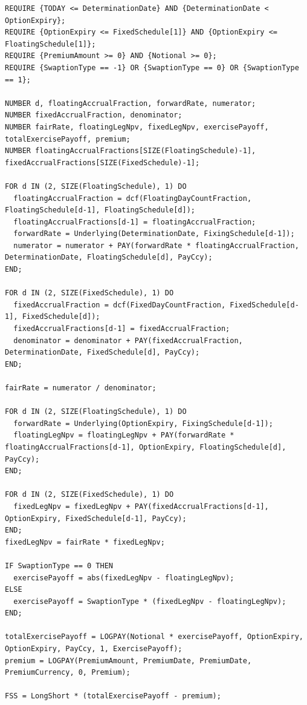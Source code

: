 \begin{listing}[hbt]
\begin{verbatim}
REQUIRE {TODAY <= DeterminationDate} AND {DeterminationDate < OptionExpiry};
REQUIRE {OptionExpiry <= FixedSchedule[1]} AND {OptionExpiry <= FloatingSchedule[1]};
REQUIRE {PremiumAmount >= 0} AND {Notional >= 0};
REQUIRE {SwaptionType == -1} OR {SwaptionType == 0} OR {SwaptionType == 1};

NUMBER d, floatingAccrualFraction, forwardRate, numerator;
NUMBER fixedAccrualFraction, denominator;
NUMBER fairRate, floatingLegNpv, fixedLegNpv, exercisePayoff, totalExercisePayoff, premium;
NUMBER floatingAccrualFractions[SIZE(FloatingSchedule)-1], fixedAccrualFractions[SIZE(FixedSchedule)-1];

FOR d IN (2, SIZE(FloatingSchedule), 1) DO
  floatingAccrualFraction = dcf(FloatingDayCountFraction, FloatingSchedule[d-1], FloatingSchedule[d]);
  floatingAccrualFractions[d-1] = floatingAccrualFraction;
  forwardRate = Underlying(DeterminationDate, FixingSchedule[d-1]);
  numerator = numerator + PAY(forwardRate * floatingAccrualFraction, DeterminationDate, FloatingSchedule[d], PayCcy);
END;

FOR d IN (2, SIZE(FixedSchedule), 1) DO
  fixedAccrualFraction = dcf(FixedDayCountFraction, FixedSchedule[d-1], FixedSchedule[d]);
  fixedAccrualFractions[d-1] = fixedAccrualFraction;
  denominator = denominator + PAY(fixedAccrualFraction, DeterminationDate, FixedSchedule[d], PayCcy);
END;

fairRate = numerator / denominator;

FOR d IN (2, SIZE(FloatingSchedule), 1) DO
  forwardRate = Underlying(OptionExpiry, FixingSchedule[d-1]);
  floatingLegNpv = floatingLegNpv + PAY(forwardRate * floatingAccrualFractions[d-1], OptionExpiry, FloatingSchedule[d], PayCcy);
END;

FOR d IN (2, SIZE(FixedSchedule), 1) DO
  fixedLegNpv = fixedLegNpv + PAY(fixedAccrualFractions[d-1], OptionExpiry, FixedSchedule[d-1], PayCcy);
END;
fixedLegNpv = fairRate * fixedLegNpv;

IF SwaptionType == 0 THEN
  exercisePayoff = abs(fixedLegNpv - floatingLegNpv);
ELSE
  exercisePayoff = SwaptionType * (fixedLegNpv - floatingLegNpv);
END;

totalExercisePayoff = LOGPAY(Notional * exercisePayoff, OptionExpiry, OptionExpiry, PayCcy, 1, ExercisePayoff);
premium = LOGPAY(PremiumAmount, PremiumDate, PremiumDate, PremiumCurrency, 0, Premium);

FSS = LongShort * (totalExercisePayoff - premium);
\end{verbatim}
\caption{Payoff script for a Forward Starting Swaption.}
\label{lst:forward_starting_swaption}
\end{listing}

